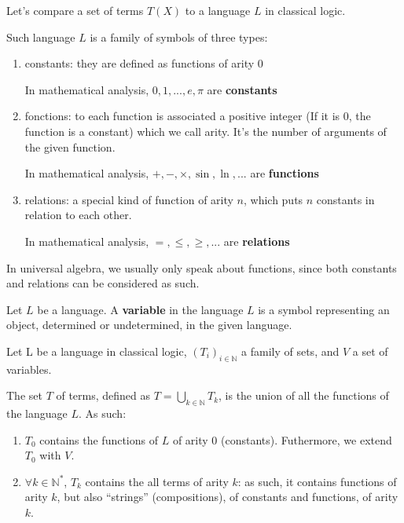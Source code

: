 \begin{remark}
  Let's compare a set of terms $T(X)$ to a language $L$ in classical logic.
  \begin{definition}[language]
  Such language $L$ is a family of symbols of three types:
  \begin{enumerate}
  \item constants: they are defined as functions of arity 0
    \begin{example}
      In mathematical analysis, $0,1,...,e,\pi$ are \textbf{constants}
    \end{example}
  \item fonctions: to each function is associated a positive integer (If it is
    0, the function is a constant) which we call arity. It's the number of
    arguments of the given function.
    \begin{example}
      In mathematical analysis, $+,-,\times,\sin,\ln,...$ are \textbf{functions}
    \end{example}
  \item relations: a special kind of function of arity $n$, which puts $n$
    constants in relation to each other.
    \begin{example}
      In mathematical analysis, $=,\leq,\geq,...$ are \textbf{relations}
    \end{example}
  \end{enumerate}
\end{definition}

\begin{remark}
  In universal algebra, we usually only speak about functions, since both
  constants and relations can be considered as such.
\end{remark}

  \begin{definition}[variable]
    Let $L$ be a language. A \textbf{variable} in the language $L$ is a symbol
    representing an object, determined or undetermined, in the given language.
  \end{definition}

  \begin{definition}[T]
    Let L be a language in classical logic, $(T_{i})_{i \in \mathbb{N}}$ a
    family of sets, and $V$ a set of variables.

    The set $T$ of terms, defined as $T = \bigcup_{k \in \mathbb{N}}T_k$, is the
    union of all the functions of the language $L$. As such:

    \begin{enumerate}
    \item $T_0$ contains the functions of $L$ of arity $0$
      (constants). Futhermore, we extend $T_0$ with $V$.
    \item $\forall k \in \mathbb{N}^{*}$, $T_k$ contains the all terms of arity
      $k$: as such, it contains functions of arity $k$, but also ``strings'' (compositions), of
      constants and functions, of arity $k$.
    \end{enumerate}
  \end{definition}


\end{remark}
